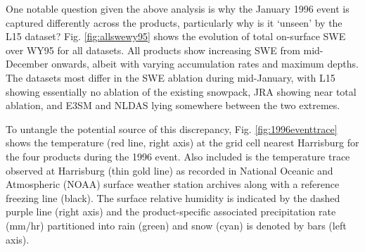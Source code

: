 \documentclass[nhess, manuscript]{copernicus}
\begin{document}

One notable question given the above analysis is why the January 1996 event is captured differently across the products, particularly why is it `unseen' by the L15 dataset?
Fig. \ref{fig:allswewy95} shows the evolution of total on-surface SWE over WY95 for all datasets. %
All products show increasing SWE from mid-December onwards, albeit with varying accumulation rates and maximum depths.
The datasets most differ in the SWE ablation during mid-January, with L15 showing essentially no ablation of the existing snowpack, JRA showing near total ablation, and E3SM and NLDAS lying somewhere between the two extremes.

To untangle the potential source of this discrepancy, Fig. \ref{fig:1996eventtrace} shows the temperature (red line, right axis) at the grid cell nearest Harrisburg for the four products during the 1996 event.
Also included is the temperature trace observed at Harrisburg (thin gold line) as recorded in National Oceanic and Atmospheric (NOAA) surface weather station archives along with a reference freezing line (black). The surface relative humidity is indicated by the dashed purple line (right axis) and the product-specific associated precipitation rate (mm/hr) partitioned into rain (green) and snow (cyan) is denoted by bars (left axis).

\end{document}
